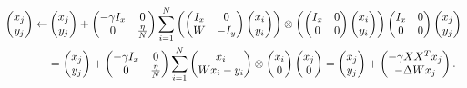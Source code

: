 \documentclass{article}
\theoremstyle{plain}
\theoremstyle{definition}
\theoremstyle{remark}
\begin{document}
\begin{align}
\left(\begin{array}{@{}c@{}}
  x_j\\
  y_j 
\end{array}\right)  \leftarrow & \left(\begin{array}{@{}c@{}}
  x_j\\
  y_j 
\end{array}\right)
+ \left(\begin{array}{@{}c c@{}}
  - \gamma I_x
  & 0 \\
  0 &
  \frac{\eta}{N}
\end{array}\right) \sum_{i=1}^N
\left(\left(\begin{array}{@{}c c@{}}
  I_x
  & 0 \\
  W &
  -I_y
\end{array}\right)
\left(\begin{array}{@{}c@{}}
  x_i\\
  y_i 
\end{array}\right)\right)
 \otimes\left(
\left(\begin{array}{@{}c c@{}}
  I_x
  & 0 \\
  0 &
  0
\end{array}\right)\left(\begin{array}{@{}c@{}}
  x_i\\
  y_i 
\end{array}\right)\right)
\left(\begin{array}{@{}c c@{}}
  I_x 
  & 0 \\
  0 &
  0
\end{array}\right)
\left(\begin{array}{@{}c@{}}
  x_j\\
  y_j 
\end{array}\right)
 \nonumber\\
&= \left(\begin{array}{@{}c@{}}
  x_j\\
  y_j 
\end{array}\right)
+ \left(\begin{array}{@{}c c@{}}
  - \gamma I_x
  & 0 \\
  0 &
  \frac{\eta}{N}
\end{array}\right) \sum_{i=1}^N
\left(\begin{array}{@{}c@{}}
  x_i\\
Wx_i - y_i 
\end{array}\right)
 \otimes\left(\begin{array}{@{}c@{}}
  x_i\\
  0 
\end{array}\right)
\left(\begin{array}{@{}c@{}}
  x_j\\
  0
\end{array}\right) = \left(\begin{array}{@{}c@{}}
  x_j\\
  y_j 
\end{array}\right) + \left(\begin{array}{@{}c@{}}
  - \gamma XX^T x_j\\
  -\Delta W x_j 
\end{array}\right).
\end{align}
\end{document}
